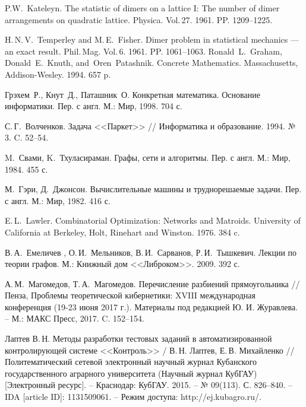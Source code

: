 \begin{thebibliography}{111}




P.W.~Kateleyn. The statistic of dimers on a lattice I: The number of dimer arrangements on quadratic lattice.
Physica. Vol.\,27. 1961. PP. 1209--1225.

H.\,N.\,V.~Temperley and M.\,E.~Fisher.
Dimer problem in statistical mechanics --- an exact result.
 Phil.\,Mag. Vol.\,6. 1961. PP. 1061--1063.
%
Ronald~L.~Graham, Donald~E.~Knuth, and~Oren~Patashnik.
Concrete Mathematics. Massachusetts, Addison-Wesley. 1994. 657 p.

Грэхем~Р., Кнут~Д., Паташник~О.
Конкретная математика. Основание информатики. Пер. с англ.
М.: Мир, 1998. 704 с.
%

С.\,Г.~Волченков. Задача <<Паркет>> // Информатика и образование. 1994.
№ 3. C. 52--54.

M.~Свами, K.~Тхуласираман. Графы, сети и алгоритмы. Пер. с англ. М.: Мир, 1984. 455 с.

М.~Гэри, Д.~Джонсон. Вычислительные машины и труднорешаемые задачи. Пер. с англ.
М.: Мир, 1982. 416 с.

E.\,L.~Lawler. Combinatorial Optimization: Networks and Matroids.
University of California at Berkeley, Holt, Rinehart and Winston. 1976. 384 c.

В.\,А.~Емеличев , О.\,И.~Мельников, В.\,И.~Сарванов, Р.\,И.~Тышкевич.
Лекции по теории графов. М.: Книжный дом <<Либроком>>. 2009. 392 с.

А.\,М.~Магомедов, Т.\,А.~Магомедов.
Перечисление разбиений прямоугольника // Пенза, Проблемы теоретической кибернетики: XVIII международная конференция (19-23 июня 2017 г.). Материалы под редакцией Ю. И. Журавлева. -- М.: МАКС Пресс, 2017. C. 152--154.









Лаптев В.\,Н. Методы разработки тестовых заданий в автоматизированной контролирующей системе <<Контроль>> / В.\,Н. Лаптев, Е.\,В. Михайленко // Политематический сетевой электронный научный журнал Кубанского государственного аграрного университета (Научный журнал КубГАУ) [Электронный ресурс]. -- Краснодар: КубГАУ. 2015. -- № 09(113). С. 826--840. -- IDA [article ID]: 1131509061. -- Режим доступа: http://ej.kubagro.ru/.


\end{thebibliography}
